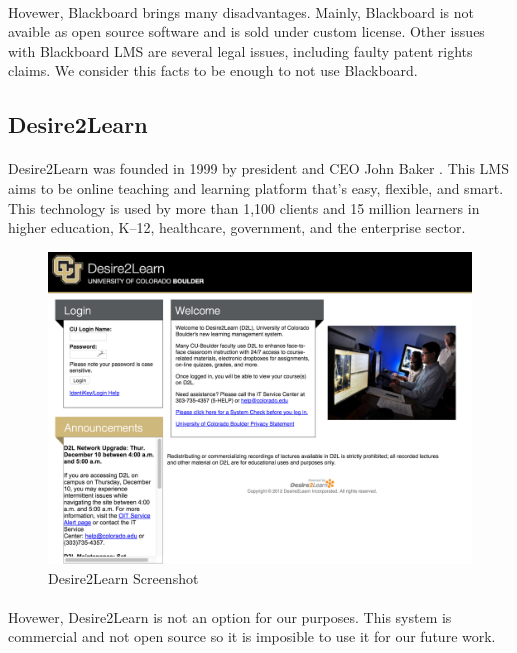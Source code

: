 \paragraph{}
Hovewer, Blackboard brings many disadvantages. Mainly, Blackboard is not avaible as open source software and is sold under custom license. Other issues with Blackboard LMS are several legal issues, including faulty patent rights claims. We consider this facts to be enough to not use Blackboard.

\subsection{Desire2Learn}
\paragraph{}
Desire2Learn was founded in 1999 by president and CEO John Baker \cite{d2l}. This LMS aims to be online teaching and learning platform that’s easy, flexible, and smart. This technology is used by more than 1,100 clients and 15 million learners in higher education, K–12, healthcare, government, and the enterprise sector.

\begin{figure}[h]
    \centering
    \includegraphics[width=\textwidth]{courses/d2l.png}
    \caption{Desire2Learn Screenshot}
    \label{d2l}
\end{figure}

\paragraph{}
Hovewer, Desire2Learn is not an option for our purposes. This system is commercial and not open source so it is imposible to use it for our future work.

